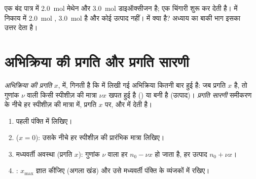 \begin{example}[बंद पात्र में मेथेन का जलना]\label{ex:g10:reaction-progress-table:methane}
एक बंद पात्र में \qty{2.0}{mol} मेथेन और \qty{3.0}{mol}
डाइऑक्सीजन है; एक चिंगारी 
 शुरू कर देती है।  में निकाय में
\qty{2.0}{mol} , \qty{3.0}{mol}  है और कोई
उत्पाद नहीं।  में क्या है? अध्याय का बाकी भाग इसका उत्तर देता है।
\end{example}

\section{अभिक्रिया की प्रगति और प्रगति सारणी}

\begin{definition}\label{def:g10:reaction-progress-table:extent}
\emph{अभिक्रिया की प्रगति} $x$,  में, गिनती है कि
 में लिखी गई अभिक्रिया कितनी बार
हुई है: जब प्रगति $x$ है, तो गुणांक $\nu$ वाली किसी स्पीशीज़ की मात्रा
$\nu x$ खपत हुई है () या बनी है (उत्पाद)।
\emph{प्रगति सारणी} समीकरण के नीचे हर स्पीशीज़ की मात्रा
 में, प्रगति $x$ पर, और  में
देती है।
\end{definition}

\begin{method}\label{met:g10:reaction-progress-table:fill}
\begin{enumerate}
  \item पहली पंक्ति में  लिखिए।
  \item {} ($x = 0$): उसके नीचे हर स्पीशीज़ की प्रारंभिक मात्रा
        लिखिए।
  \item मध्यवर्ती अवस्था (प्रगति $x$): गुणांक $\nu$ वाला हर 
        $n_0 - \nu x$ हो जाता है, हर उत्पाद $n_0 + \nu x$।
  \item {}: $x_{\max}$ ज्ञात कीजिए (अगला खंड) और उसे मध्यवर्ती पंक्ति
        के व्यंजकों में रखिए।
\end{enumerate}
\end{method}

